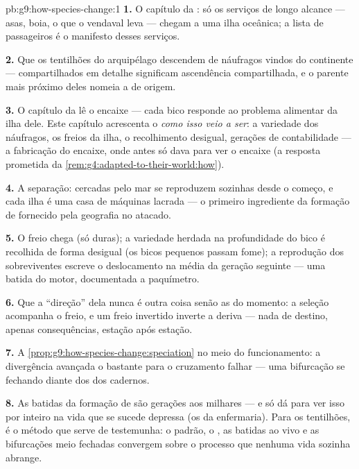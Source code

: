 \begin{solution}{pb:g9:how-species-change:1}
\textbf{1.} O capítulo da : só os serviços de longo
alcance --- asas, boia, o que o vendaval leva --- chegam a
uma ilha oceânica; a lista de passageiros é o manifesto
desses serviços.

\textbf{2.} Que os tentilhões do arquipélago descendem de
náufragos vindos do continente ---  compartilhados
em detalhe significam ascendência compartilhada, e o parente
mais próximo deles nomeia a  de origem.

\textbf{3.} O capítulo da  lê o encaixe --- cada
bico responde ao problema alimentar da ilha dele. Este
capítulo acrescenta o \emph{como isso veio a ser}: a
variedade dos náufragos, os freios da ilha, o recolhimento
desigual, gerações de contabilidade --- a fabricação do
encaixe, onde antes só dava para ver o encaixe (a resposta
prometida da \cref{rem:g4:adapted-to-their-world:how}).

\textbf{4.} A separação:  cercadas pelo mar se
reproduzem sozinhas desde o começo, e cada ilha é uma casa de
máquinas lacrada --- o primeiro ingrediente da formação de
 fornecido pela geografia no atacado.

\textbf{5.} O freio chega (só  duras); a variedade
herdada na profundidade do bico é recolhida de forma desigual
(os bicos pequenos passam fome); a reprodução dos
sobreviventes escreve o deslocamento na média da geração
seguinte --- uma batida do motor, documentada a paquímetro.

\textbf{6.} Que a ``direção'' dela nunca é outra coisa senão
as  do momento: a seleção acompanha o freio, e um
freio invertido inverte a deriva --- nada de destino, apenas
consequências, estação após estação.

\textbf{7.} A \cref{prop:g9:how-species-change:speciation} no
meio do funcionamento: a divergência avançada o bastante para
o cruzamento falhar --- uma bifurcação se fechando diante dos
 dos cadernos.

\textbf{8.} As batidas da formação de  são gerações
aos milhares --- e só dá para ver isso por inteiro na vida
que se sucede depressa (os  da enfermaria). Para os
tentilhões, é o método que serve de testemunha: o padrão, o
, as batidas ao vivo e as bifurcações meio fechadas
convergem sobre o processo que nenhuma vida sozinha abrange.


\end{solution}
